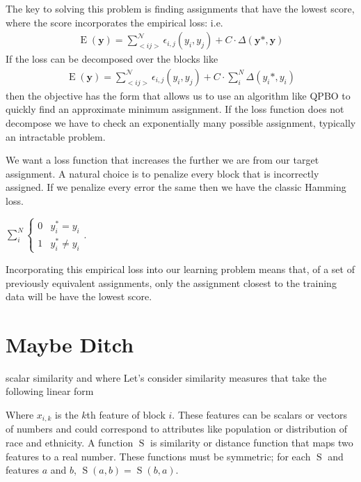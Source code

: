 The key to solving this problem is finding assignments that have the
lowest score, where the score incorporates the empirical loss: i.e.
%
\begin{align}
\operatorname{E}(\mathbf{y}) = \sum_{<i j>}^{\mathcal{N}}\epsilon_{i,j}(y_i,y_j) + C\cdot\Delta(\mathbf{y}*,
\mathbf{y})
\end{align}
%
If the loss can be decomposed over the blocks like
%
\begin{align}
\operatorname{E}(\mathbf{y}) = \sum_{<i j>}^{\mathcal{N}}\epsilon_{i,j}(y_i,y_j) + C\cdot\sum_i^N\Delta(y_i*, y_i)
\end{align}
%
then the objective has the form that allows us to use an algorithm
like QPBO to quickly find an approximate minimum assignment. If the
loss function does not decompose we have to check an exponentially
many possible assignment, typically an intractable problem.

We want a loss function that increases the further we are from our
target assignment. A natural choice is to penalize every block that is
incorrectly assigned. If we penalize every error the same then we have
the classic Hamming loss. 

$\sum_i^N\begin{cases}
  0 &y_i^* = y_i \\
  1 &y_i^* \neq y_i
\end{cases}$. 

Incorporating this empirical loss into our learning problem means
that, of a set of previously equivalent assignments, only the
assignment closest to the training data will be have the lowest score.


\section*{Maybe Ditch}
scalar similarity 
and where 
Let's consider similarity measures that take the following linear form


Where $x_{i,k}$ is the $k$th feature of block $i$. These features can
be scalars or vectors of numbers and could correspond to attributes
like population or distribution of race and ethnicity. A function
$\operatorname{S}$ is similarity or distance function that maps two
features to a real number. These functions must be symmetric; for each
$\operatorname{S}$ and features $a$ and $b$, $\operatorname{S}(a,b) =
\operatorname{S}(b,a)$.
